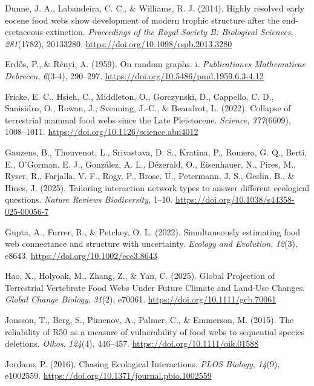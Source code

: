\documentclass[
]{article}
\newlength{\cslhangindent}
\newenvironment{CSLReferences}[2] %
 {\begin{list}{}{%
  \setlength{\itemindent}{0pt}
  \setlength{\leftmargin}{0pt}
  \setlength{\parsep}{0pt}
  \ifodd #1
   \setlength{\leftmargin}{\cslhangindent}
   \setlength{\itemindent}{-1\cslhangindent}
  \fi
  \setlength{\itemsep}{#2\baselineskip}}}
 {\end{list}}
\begin{document}
\begin{CSLReferences}{1}{0}
Dunne, J. A., Labandeira, C. C., \& Williams, R. J. (2014). Highly
resolved early eocene food webs show development of modern trophic
structure after the end-cretaceous extinction. \emph{Proceedings of the
Royal Society B: Biological Sciences}, \emph{281}(1782), 20133280.
\url{https://doi.org/10.1098/rspb.2013.3280}

Erdős, P., \& Rényi, A. (1959). On random graphs. i. \emph{Publicationes
Mathematicae Debrecen}, \emph{6}(3-4), 290--297.
\url{https://doi.org/10.5486/pmd.1959.6.3-4.12}

Fricke, E. C., Hsieh, C., Middleton, O., Gorczynski, D., Cappello, C.
D., Sanisidro, O., Rowan, J., Svenning, J.-C., \& Beaudrot, L. (2022).
Collapse of terrestrial mammal food webs since the Late Pleistocene.
\emph{Science}, \emph{377}(6609), 1008--1011.
\url{https://doi.org/10.1126/science.abn4012}

Gauzens, B., Thouvenot, L., Srivastava, D. S., Kratina, P., Romero, G.
Q., Berti, E., O'Gorman, E. J., González, A. L., Dézerald, O.,
Eisenhauer, N., Pires, M., Ryser, R., Farjalla, V. F., Rogy, P., Brose,
U., Petermann, J. S., Geslin, B., \& Hines, J. (2025). Tailoring
interaction network types to answer different ecological questions.
\emph{Nature Reviews Biodiversity}, 1--10.
\url{https://doi.org/10.1038/s44358-025-00056-7}

Gupta, A., Furrer, R., \& Petchey, O. L. (2022). Simultaneously
estimating food web connectance and structure with uncertainty.
\emph{Ecology and Evolution}, \emph{12}(3), e8643.
\url{https://doi.org/10.1002/ece3.8643}

Hao, X., Holyoak, M., Zhang, Z., \& Yan, C. (2025). Global Projection of
Terrestrial Vertebrate Food Webs Under Future Climate and Land-Use
Changes. \emph{Global Change Biology}, \emph{31}(2), e70061.
\url{https://doi.org/10.1111/gcb.70061}

Jonsson, T., Berg, S., Pimenov, A., Palmer, C., \& Emmerson, M. (2015).
The reliability of R50 as a measure of vulnerability of food webs to
sequential species deletions. \emph{Oikos}, \emph{124}(4), 446--457.
\url{https://doi.org/10.1111/oik.01588}

Jordano, P. (2016). Chasing Ecological Interactions. \emph{PLOS
Biology}, \emph{14}(9), e1002559.
\url{https://doi.org/10.1371/journal.pbio.1002559}


\end{CSLReferences}
\end{document}
